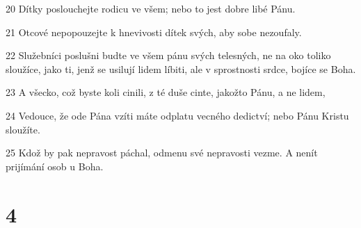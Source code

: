 \par 20 Dítky poslouchejte rodicu ve všem; nebo to jest dobre libé Pánu.
\par 21 Otcové nepopouzejte k hnevivosti dítek svých, aby sobe nezoufaly.
\par 22 Služebníci poslušni budte ve všem pánu svých telesných, ne na oko toliko sloužíce, jako ti, jenž se usilují lidem líbiti, ale v sprostnosti srdce, bojíce se Boha.
\par 23 A všecko, což byste koli cinili, z té duše cinte, jakožto Pánu, a ne lidem,
\par 24 Vedouce, že ode Pána vzíti máte odplatu vecného dedictví; nebo Pánu Kristu sloužíte.
\par 25 Kdož by pak nepravost páchal, odmenu své nepravosti vezme. A nenít prijímání osob u Boha.

\chapter{4}

